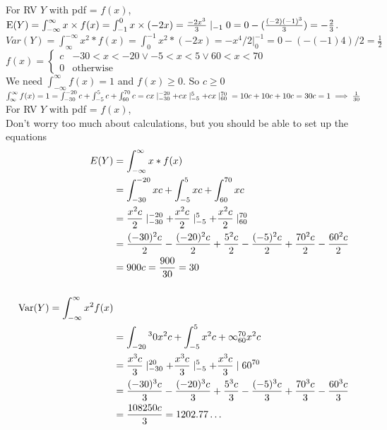 \begin{enumerate}[label=(\alph*)]
\begin{solution}[5.2cm]
For RV $Y$ with pdf = $f(x)$, \\
$\text{E}(Y) = \int_{-\infty}^{\infty} x \times f(x) = \int_{-1}^{0} x \times 
(-2x) =  \frac{-2x^3}{3} \mid_{-1}{0} = 0 - (\frac{(-2)(-1)^3}{3}) = 
-\frac{2}{3}$. \\
$Var(Y) = \int_\infty^{-\infty} x^2*f(x) = \int_0^{-1} x^2*(-2x)
= -x^4/2 |_0^{-1} = 0 - (-(-1)4)/2 = \frac{1}{2}$ \\
$f(x) = \begin{cases} c & -30 < x < -20 \lor -5 < x < 5 \lor 60 < x < 
70 \\ 0 & \text{otherwise} \end{cases}$ \\
We need $\int_{-\infty}^{\infty} f(x) = 1$ and $f(x) \ge 0$. So $c \ge 0$ \\
$\int_{\infty}^{\infty} f(x) = 1 = \int_{-30}^{-20} c + \int_{-5}^{5} c 
+ \int_{60}^{70} c = cx\mid_{-30}^{-20} + cx\mid_{-5}^{5} + cx\mid_{60}^{70} \\
= 10c + 10c + 10c = 30c = 1 \implies \frac{1}{30}$
For RV $Y$ with pdf = $f(x)$, \\
Don’t worry too much about calculations, but you should be able to set 
up the equations
\begin{align*}
E(Y) &= \int_{-\infty}^{\infty} x * f(x) \\
&= \int_{-30}^{-20} xc + \int_{-5}^{5} xc + \int_{60}^{70} xc \\
&= \frac{x^2c}{2}\mid_{-30}^{-20} + \frac{x^2c}{2}\mid_{-5}^{5} + 
\frac{x^2c}{2}\mid_{60}^{70} \\
&= \frac{(-30)^2c}{2} - \frac{(-20)^2c}{2} + \frac{5^2c}{2} - 
\frac{(-5)^2c}{2} + \frac{70^2c}{2} - \frac{60^2c}{2} \\
&= 900c = \frac{900}{30} = 30 \\\\
\text{Var}(Y) = \int_{-\infty}^{\infty} x^2f(x) \\
&= \int_{-20}{^30} x^2c + \int_{-5}^{5} x^2c+ \infty_{60}^{70} x^2c \\
&= \frac{x^3c}{3} \mid_{-30}^{20} + \frac{x^3c}{3}\mid_{-5}^{5} + 
\frac{x^3c}{3}\mid{60}^{70} \\
&= \frac{(-30)^3c}{3} - \frac{(-20)^{3}c}{3} + \frac{5^3c}{3} - 
\frac{(-5)^3c}{3} + \frac{70^3c}{3} - \frac{60^3c}{3} \\
&= \frac{108250c}{3} = 1202.77\ldots
\end{align*}
\end{solution}
\end{enumerate}